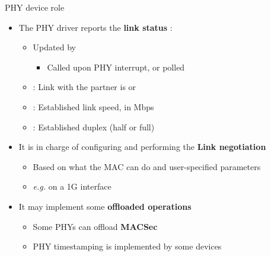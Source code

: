 \begin{frame}{PHY device role}
	\begin{itemize}
		\item The PHY driver reports the \textbf{link status} :
			\begin{itemize}
				\item Updated by 
					\begin{itemize}
						\item Called upon PHY interrupt, or polled
					\end{itemize}
				\item {} : Link with the partner is  or 
				\item {} : Established link speed, in Mbps
				\item {} : Established duplex (half or full)
			\end{itemize}
		\item It is in charge of configuring and performing the \textbf{Link negotiation}
			\begin{itemize}
				\item Based on what the MAC can do and user-specified parameters
				\item \textit{e.g.}  on a 1G interface
			\end{itemize}
		\item It may implement some \textbf{offloaded operations}
			\begin{itemize}
				\item Some PHYs can offload \textbf{MACSec}
				\item PHY timestamping is implemented by some devices
			\end{itemize}
	\end{itemize}
\end{frame}

